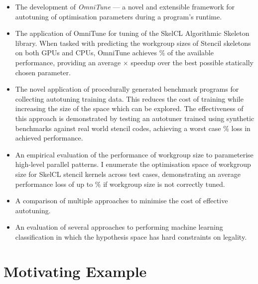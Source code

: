 \begin{itemize}
\item The development of \emph{OmniTune} --- a novel and extensible
  framework for autotuning of optimisation parameters during a
  program's runtime.
\item The application of OmniTune for tuning of the SkelCL Algorithmic
  Skeleton library. When tasked with predicting the workgroup sizes of
  Stencil skeletons on both GPUs and CPUs, OmniTune achieves
  $\%$ of the available
  performance, providing an average
  $\times$ speedup over the
  best possible statically chosen parameter.
\item The novel application of procedurally generated benchmark
  programs for collecting autotuning training data. This reduces the
  cost of training while increasing the size of the space which can be
  explored. The effectiveness of this approach is demonstrated by
  testing an autotuner trained using synthetic benchmarks against
   real world stencil codes, achieving a
  worst case
  $\%$
  loss in achieved performance.
\item An empirical evaluation of the performance of workgroup size to
  parameterise high-level parallel patterns. I enumerate the
  optimisation space of workgroup size for SkelCL stencil kernels
  across  test cases, demonstrating an
  average performance loss of up to
  $\%$ if workgroup size is not
  correctly tuned. %
\item A comparison of multiple approaches to minimise the cost of
  effective autotuning. 
\item An evaluation of several approaches to performing machine
  learning classification in which the hypothesis space has hard
  constraints on legality. 
\end{itemize}


\section{Motivating Example}

